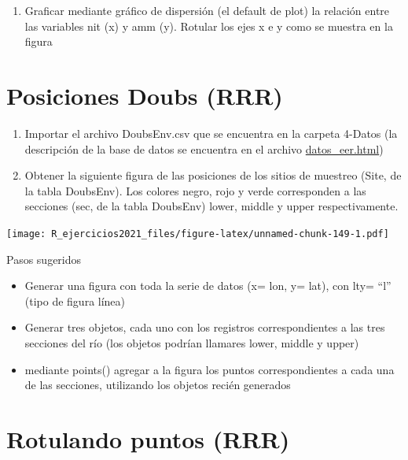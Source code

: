 \documentclass[]{book}
\providecommand{\tightlist}{%
  \setlength{\itemsep}{0pt}\setlength{\parskip}{0pt}}
\begin{document}
\begin{enumerate}
\def\labelenumi{\arabic{enumi}.}
\setcounter{enumi}{1}
\tightlist
\item
  Graficar mediante gráfico de dispersión (el default de plot) la relación entre las variables nit (x) y amm (y). Rotular los ejes x e y como se muestra en la figura
\end{enumerate}

\hypertarget{posiciones-doubs-rrr}{%
\section{Posiciones Doubs (RRR)}\label{posiciones-doubs-rrr}}

\begin{enumerate}
\def\labelenumi{\arabic{enumi}.}
\item
  Importar el archivo DoubsEnv.csv que se encuentra en la carpeta 4-Datos (la descripción de la base de datos se encuentra en el archivo \url{datos_eer.html})
\item
  Obtener la siguiente figura de las posiciones de los sitios de muestreo (Site, de la tabla DoubsEnv). Los colores negro, rojo y verde corresponden a las secciones (sec, de la tabla DoubsEnv) lower, middle y upper respectivamente.
\end{enumerate}

\texttt{[image: R\_ejercicios2021\_files/figure-latex/unnamed-chunk-149-1.pdf]}

Pasos sugeridos

\begin{itemize}
\tightlist
\item
  Generar una figura con toda la serie de datos (x= lon, y= lat), con lty= ``l'' (tipo de figura línea)
\item
  Generar tres objetos, cada uno con los registros correspondientes a las tres secciones del río (los objetos podrían llamares lower, middle y upper)
\item
  mediante points() agregar a la figura los puntos correspondientes a cada una de las secciones, utilizando los objetos recién generados
\end{itemize}

\hypertarget{rotulando-puntos-rrr}{%
\section{Rotulando puntos (RRR)}\label{rotulando-puntos-rrr}}
\end{document}
